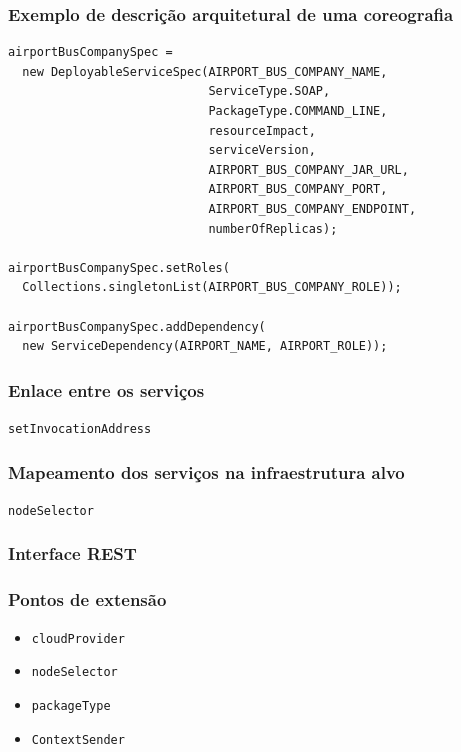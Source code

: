 \documentclass{beamer}
\begin{document}
\begin{frame}[fragile]
\frametitle{Exemplo de descrição arquitetural de uma coreografia}

\begin{block}{}
{\scriptsize
\begin{lstlisting}[breaklines]
airportBusCompanySpec =
  new DeployableServiceSpec(AIRPORT_BUS_COMPANY_NAME, 
  							ServiceType.SOAP, 
  							PackageType.COMMAND_LINE, 
  							resourceImpact, 
  							serviceVersion, 
  							AIRPORT_BUS_COMPANY_JAR_URL, 
  							AIRPORT_BUS_COMPANY_PORT, 
  							AIRPORT_BUS_COMPANY_ENDPOINT, 
  							numberOfReplicas);

airportBusCompanySpec.setRoles(
  Collections.singletonList(AIRPORT_BUS_COMPANY_ROLE));

airportBusCompanySpec.addDependency(
  new ServiceDependency(AIRPORT_NAME, AIRPORT_ROLE));
\end{lstlisting}
}
\end{block}

\end{frame}


\begin{frame}
\frametitle{Enlace entre os serviços}

\texttt{setInvocationAddress}

\end{frame}


\begin{frame}
\frametitle{Mapeamento dos serviços na infraestrutura alvo}

\texttt{nodeSelector}

\end{frame}


\begin{frame}
\frametitle{Interface REST}



\end{frame}


\begin{frame}
\frametitle{Pontos de extensão}

\begin{itemize}
\item \texttt{cloudProvider}
\item \texttt{nodeSelector}
\item \texttt{packageType}
\item \texttt{ContextSender}
\end{itemize}

\end{frame}
\end{document}
